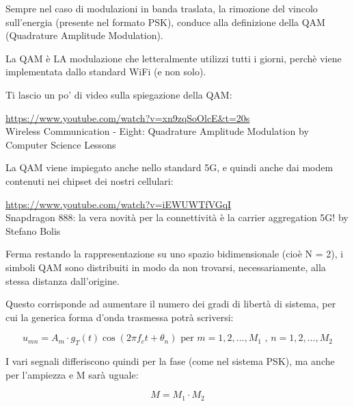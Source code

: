 Sempre nel caso di modulazioni in banda traslata, 
la rimozione del vincolo sull'energia (presente nel formato PSK), 
conduce alla definizione della QAM (Quadrature Amplitude Modulation). \newline 

\begin{tcolorbox}
    La QAM è LA modulazione che letteralmente utilizzi tutti i giorni, perchè viene implementata dallo standard WiFi (e non solo). \newline 

    Ti lascio un po' di video sulla spiegazione della QAM: \newline 

    \url{https://www.youtube.com/watch?v=xn9zqSoOlcE&t=20s}\\
    Wireless Communication - Eight: Quadrature Amplitude Modulation by Computer Science Lessons \newline 

    La QAM viene impiegato anche nello standard 5G, e quindi anche dai modem contenuti nei chipset dei nostri cellulari: \newline 

    \url{https://www.youtube.com/watch?v=iEWUWTfVGqI} \\
    Snapdragon 888: la vera novità per la connettività è la carrier aggregation 5G! by Stefano Bolis
\end{tcolorbox}

Ferma restando la rappresentazione su uno spazio bidimensionale (cioè N = 2), 
i simboli QAM sono distribuiti in modo da non trovarsi, necessariamente, alla stessa distanza dall'origine. \newline 

Questo corrisponde ad aumentare il numero dei gradi di libertà di sistema, per cui la generica forma d'onda trasmessa potrà scriversi: 

{
    \Large 
    \begin{equation}
        u_{mn}
        = 
        A_m \cdot g_T (t) \cos(2 \pi f_c t + \theta_n) \text{ per } m = 1, 2, \dots, M_1 \text{ , } n = 1, 2, \dots, M_2
    \end{equation}
}

I vari segnali differiscono quindi per la fase (come nel sistema PSK), 
ma anche per l'ampiezza e M sarà uguale: 

{
    \Large 
    \begin{equation}
        M = M_1 \cdot M_2
    \end{equation}
}

